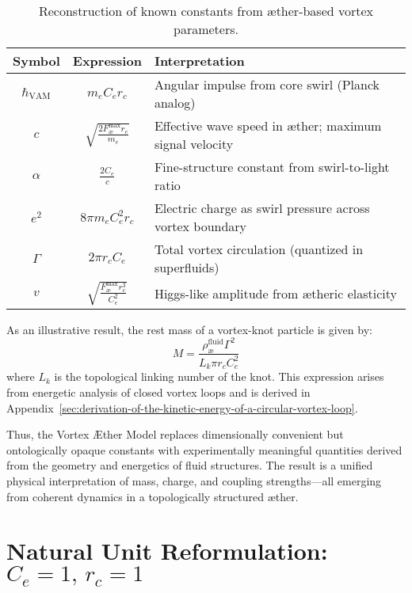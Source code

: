 \begin{table}[H]
    \centering
    \footnotesize
    \renewcommand{\arraystretch}{1.3}
    \begin{tabular}{|c|c|l|}
        \hline
        \textbf{Symbol} & \textbf{Expression} & \textbf{Interpretation} \\
        \hline
        \( \hbar_{\text{VAM}} \) & \( m_e C_e r_c \) & Angular impulse from core swirl (Planck analog) \\
        \hline
        \( c \) & \( \sqrt{\frac{2 F^{\text{max}}_{\text{\ae}} r_c}{m_e}} \) & Effective wave speed in æther; maximum signal velocity \\
        \hline
        \( \alpha \) & \( \frac{2 C_e}{c} \) & Fine-structure constant from swirl-to-light ratio \\
        \hline
        \( e^2 \) & \( 8\pi m_e C_e^2 r_c \) & Electric charge as swirl pressure across vortex boundary \\
        \hline
        \( \Gamma \) & \( 2\pi r_c C_e \) & Total vortex circulation (quantized in superfluids) \\
        \hline
        \( v \) & \( \sqrt{\frac{F^{\text{max}}_{\text{\ae}} r_c^3}{C_e^2}} \) & Higgs-like amplitude from ætheric elasticity \\
        \hline
    \end{tabular}
    \caption{Reconstruction of known constants from æther-based vortex parameters.}
    \label{tab:VAM_constants}
\end{table}

\noindent As an illustrative result, the rest mass of a vortex-knot particle is given by:
\[
M = \frac{\rho_\text{\ae}^{\text{fluid}} \Gamma^2}{L_k \pi r_c C_e^2}
\]
where \( L_k \) is the topological linking number of the knot. This expression arises from energetic analysis of closed vortex loops and is derived in Appendix~\ref{sec:derivation-of-the-kinetic-energy-of-a-circular-vortex-loop}.

\vspace{0.5em}

Thus, the Vortex Æther Model replaces dimensionally convenient but ontologically opaque constants with experimentally meaningful quantities derived from the geometry and energetics of fluid structures. The result is a unified physical interpretation of mass, charge, and coupling strengths—all emerging from coherent dynamics in a topologically structured æther.

\section*{Natural Unit Reformulation: \( C_e = 1, \, r_c = 1 \)}

